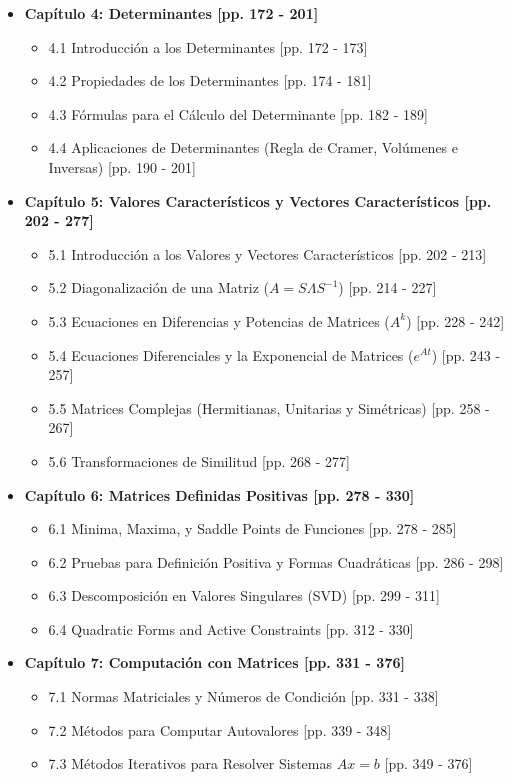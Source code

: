 \documentclass[11pt,a4paper]{article}
\begin{document}
\begin{itemize}
    \item \textbf{Capítulo 4: Determinantes [pp. 172 - 201]}
    \begin{itemize}
        \item 4.1 Introducción a los Determinantes [pp. 172 - 173]
        \item 4.2 Propiedades de los Determinantes [pp. 174 - 181]
        \item 4.3 Fórmulas para el Cálculo del Determinante [pp. 182 - 189]
        \item 4.4 Aplicaciones de Determinantes (Regla de Cramer, Volúmenes e Inversas) [pp. 190 - 201]
    \end{itemize}

    \item \textbf{Capítulo 5: Valores Característicos y Vectores Característicos [pp. 202 - 277]}
    \begin{itemize}
        \item 5.1 Introducción a los Valores y Vectores Característicos [pp. 202 - 213]
        \item 5.2 Diagonalización de una Matriz ($A = S\Lambda S^{-1}$) [pp. 214 - 227]
        \item 5.3 Ecuaciones en Diferencias y Potencias de Matrices ($A^k$) [pp. 228 - 242]
        \item 5.4 Ecuaciones Diferenciales y la Exponencial de Matrices ($e^{At}$) [pp. 243 - 257]
        \item 5.5 Matrices Complejas (Hermitianas, Unitarias y Simétricas) [pp. 258 - 267]
        \item 5.6 Transformaciones de Similitud [pp. 268 - 277]
    \end{itemize}

    \item \textbf{Capítulo 6: Matrices Definidas Positivas [pp. 278 - 330]}
    \begin{itemize}
        \item 6.1 Minima, Maxima, y Saddle Points de Funciones [pp. 278 - 285]
        \item 6.2 Pruebas para Definición Positiva y Formas Cuadráticas [pp. 286 - 298]
        \item 6.3 Descomposición en Valores Singulares (SVD) [pp. 299 - 311]
        \item 6.4 Quadratic Forms and Active Constraints [pp. 312 - 330]
    \end{itemize}

    \item \textbf{Capítulo 7: Computación con Matrices [pp. 331 - 376]}
    \begin{itemize}
        \item 7.1 Normas Matriciales y Números de Condición [pp. 331 - 338]
        \item 7.2 Métodos para Computar Autovalores [pp. 339 - 348]
        \item 7.3 Métodos Iterativos para Resolver Sistemas $Ax = b$ [pp. 349 - 376]
    \end{itemize}


\end{itemize}
\end{document}
